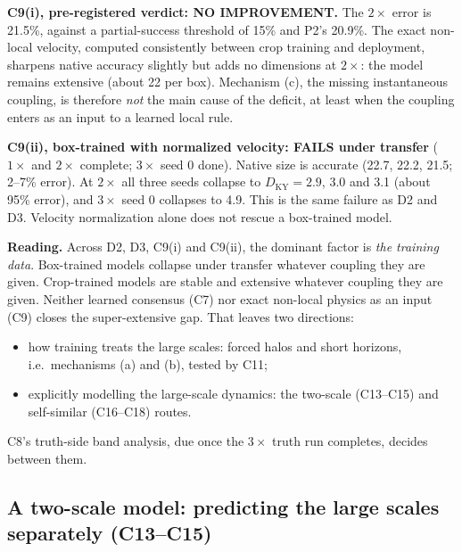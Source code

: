 \documentclass[11pt]{article}
\begin{document}
\textbf{C9(i), pre-registered verdict: NO IMPROVEMENT.} The $2\times$
error is 21.5\%, against a partial-success threshold of 15\% and P2's
20.9\%. The exact non-local velocity, computed consistently between crop
training and deployment, sharpens native accuracy slightly but adds no
dimensions at $2\times$: the model remains extensive (about 22 per box).
Mechanism (c), the missing instantaneous coupling, is therefore
\emph{not} the main cause of the deficit, at least when the coupling
enters as an input to a learned local rule.

\textbf{C9(ii), box-trained with normalized velocity: FAILS under
transfer} ($1\times$ and $2\times$ complete; $3\times$ seed 0 done).
Native size is accurate (22.7, 22.2, 21.5; 2--7\% error). At $2\times$
all three seeds collapse to $D_{\mathrm{KY}}=2.9$, 3.0 and 3.1 (about
95\% error), and $3\times$ seed 0 collapses to 4.9. This is the same
failure as D2 and D3. Velocity normalization alone does not rescue a
box-trained model.

\textbf{Reading.} Across D2, D3, C9(i) and C9(ii), the dominant factor is
\emph{the training data}. Box-trained models collapse under transfer
whatever coupling they are given. Crop-trained models are stable and
extensive whatever coupling they are given. Neither learned consensus
(C7) nor exact non-local physics as an input (C9) closes the
super-extensive gap. That leaves two directions:
\begin{itemize}[leftmargin=*]
\item how training treats the large scales: forced halos and short
  horizons, i.e.\ mechanisms (a) and (b), tested by C11;
\item explicitly modelling the large-scale dynamics: the two-scale
  (C13--C15) and self-similar (C16--C18) routes.
\end{itemize}
C8's truth-side band analysis, due once the $3\times$ truth run
completes, decides between them.

\subsection{A two-scale model: predicting the large scales separately (C13--C15)}
\label{sec:two_scale}
\end{document}
